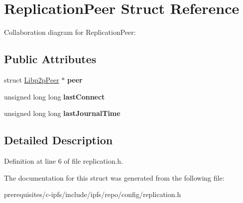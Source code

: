 \hypertarget{struct_replication_peer}{}\section{Replication\+Peer Struct Reference}
\label{struct_replication_peer}


Collaboration diagram for Replication\+Peer\+:
\subsection*{Public Attributes}
\begin{DoxyCompactItemize}
\item 
\mbox{\label{struct_replication_peer_adf884a40c29dfbb97b99d7fd528b5241}} 
struct \mbox{\hyperlink{struct_libp2p_peer}{Libp2p\+Peer}} $\ast$ {\bfseries peer}
\item 
\mbox{\label{struct_replication_peer_ac6d551d85cdb97a5f17579566b201e9c}} 
unsigned long long {\bfseries last\+Connect}
\item 
\mbox{\label{struct_replication_peer_a003725c14e47f4e05378a5311b9d18b7}} 
unsigned long long {\bfseries last\+Journal\+Time}
\end{DoxyCompactItemize}


\subsection{Detailed Description}


Definition at line 6 of file replication.\+h.



The documentation for this struct was generated from the following file\+:\begin{DoxyCompactItemize}
\item 
prerequisites/c-\/ipfs/include/ipfs/repo/config/replication.\+h\end{DoxyCompactItemize}
